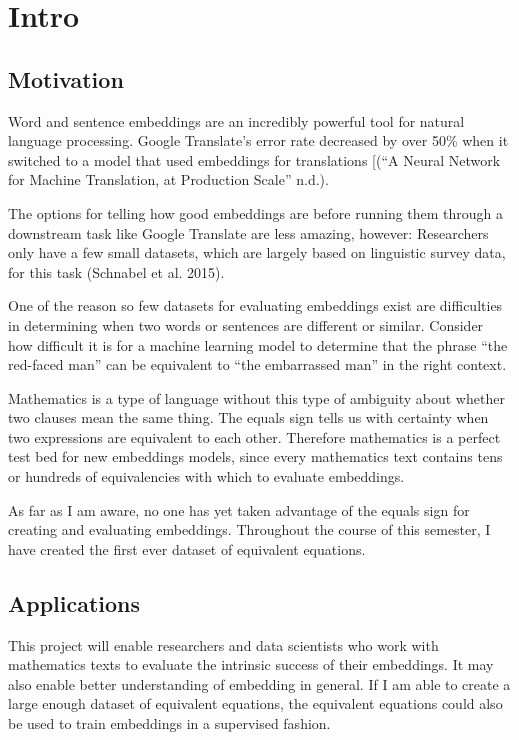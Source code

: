 \documentclass[]{article}
\date{}
\begin{document}
{
\setcounter{tocdepth}{3}
\tableofcontents
}
\hypertarget{intro}{%
\section{Intro}\label{intro}}

\hypertarget{motivation}{%
\subsection{Motivation}\label{motivation}}

Word and sentence embeddings are an incredibly powerful tool for natural
language processing. Google Translate's error rate decreased by over
50\% when it switched to a model that used embeddings for translations
{[}(``A Neural Network for Machine Translation, at Production Scale''
n.d.).

The options for telling how good embeddings are before running them
through a downstream task like Google Translate are less amazing,
however: Researchers only have a few small datasets, which are largely
based on linguistic survey data, for this task (Schnabel et al. 2015).

One of the reason so few datasets for evaluating embeddings exist are
difficulties in determining when two words or sentences are different or
similar. Consider how difficult it is for a machine learning model to
determine that the phrase ``the red-faced man'' can be equivalent to
``the embarrassed man'' in the right context.

Mathematics is a type of language without this type of ambiguity about
whether two clauses mean the same thing. The equals sign tells us with
certainty when two expressions are equivalent to each other. Therefore
mathematics is a perfect test bed for new embeddings models, since every
mathematics text contains tens or hundreds of equivalencies with which
to evaluate embeddings.

As far as I am aware, no one has yet taken advantage of the equals sign
for creating and evaluating embeddings. Throughout the course of this
semester, I have created the first ever dataset of equivalent equations.

\hypertarget{applications}{%
\subsection{Applications}\label{applications}}

This project will enable researchers and data scientists who work with
mathematics texts to evaluate the intrinsic success of their embeddings.
It may also enable better understanding of embedding in general. If I am
able to create a large enough dataset of equivalent equations, the
equivalent equations could also be used to train embeddings in a
supervised fashion.
\end{document}

